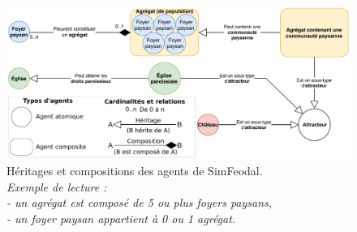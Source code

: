 \begin{figure}[H]
	\centering
	\includegraphics[width=\linewidth]{img/agents_constitution.pdf}
	\caption{Héritages et compositions des agents de SimFeodal.\\
		\textit{Exemple de lecture :\\
			- un agrégat est composé de 5 ou plus foyers paysans,\\
			- un foyer paysan appartient à 0 ou 1 agrégat.}}
	\label{fig:constitution-agents}
\end{figure}


